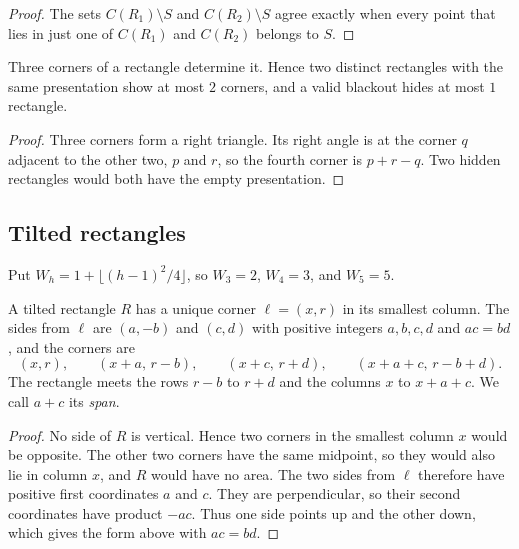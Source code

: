 \begin{proof}
The sets $C(R_1)\setminus S$ and $C(R_2)\setminus S$ agree exactly when every
point that lies in just one of $C(R_1)$ and $C(R_2)$ belongs to $S$.
\end{proof}

\begin{lemma}\label{lem:threecorners}
Three corners of a rectangle determine it. Hence two distinct rectangles with the
same presentation show at most $2$ corners, and a valid blackout hides at most
$1$ rectangle.
\end{lemma}

\begin{proof}
Three corners form a right triangle. Its right angle is at the corner $q$
adjacent to the other two, $p$ and $r$, so the fourth corner is $p+r-q$. Two
hidden rectangles would both have the empty presentation.
\end{proof}

\subsection{Tilted rectangles}

Put $W_h=1+\lfloor(h-1)^2/4\rfloor$, so $W_3=2$, $W_4=3$, and $W_5=5$.

\begin{lemma}\label{lem:leftmost}
A tilted rectangle $R$ has a unique corner $\ell=(x,r)$ in its smallest column.
The sides from $\ell$ are $(a,-b)$ and $(c,d)$ with positive integers $a,b,c,d$
and $ac=bd$, and the corners are
\begin{equation}\label{eq:tilt-param}
(x,r),\qquad(x+a,\,r-b),\qquad(x+c,\,r+d),\qquad(x+a+c,\,r-b+d).
\end{equation}
The rectangle meets the rows $r-b$ to $r+d$ and the columns $x$ to $x+a+c$. We
call $a+c$ its \emph{span}.
\end{lemma}

\begin{proof}
No side of $R$ is vertical. Hence two corners in the smallest column $x$ would
be opposite. The other two corners have the same midpoint, so they would also
lie in column $x$, and $R$ would have no area. The two sides from
$\ell$ therefore have positive first coordinates $a$ and $c$. They are
perpendicular, so their second coordinates have product $-ac$. Thus one
side points up and the other down, which gives the form above with $ac=bd$.
\end{proof}

